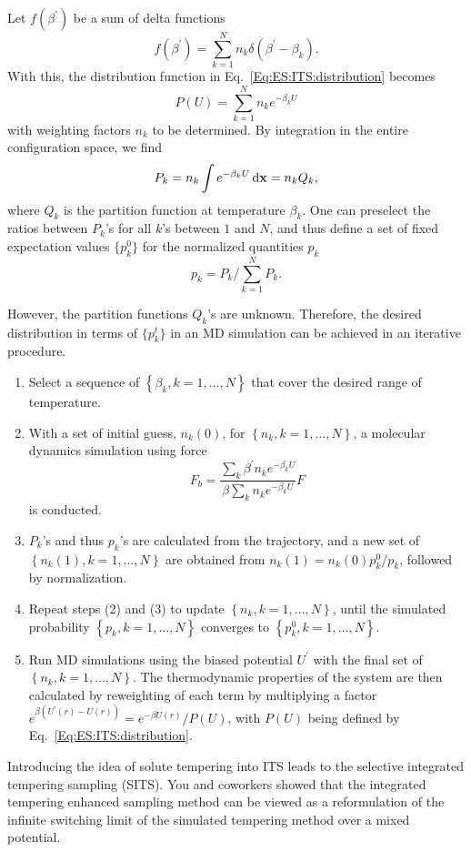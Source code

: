 Let $f(\beta^\prime)$ be a sum of delta functions
\begin{equation}
	f\left(\beta^{\prime}\right)=\sum_{k=1}^N n_k \delta\left(\beta^{\prime}-\beta_k\right) .
\end{equation}
With this, the distribution function in Eq.~\ref{Eq:ES:ITS:distribution} becomes
\begin{equation}
	P(U)=\sum_{k=1}^N n_k  e^{-\beta_k U}
\end{equation}
with weighting factors $n_k$ to be determined. By integration in  the entire configuration space, we find
\begin{equation}
	P_k= n_k \int e^{-\beta_k  U}\mathop{}\!\mathrm{d} \mathbf{x}= n_k Q_k,
\end{equation}
where $Q_k$ is the partition function at temperature $\beta_k$. One can preselect the ratios between $P_k$'s for all $k$'s between $1$ and $N$, and thus define a set of fixed expectation values $\{p_k^0\}$ for the normalized quantities $p_k$
\begin{equation}
	p_k=P_k/\sum_{k=1}^N P_k.
\end{equation}

However, the partition functions $Q_k$'s are unknown. Therefore, the desired distribution in terms of $\{p_k^t\}$ in an MD simulation can be achieved in an iterative procedure.
\begin{enumerate}
	\item Select a sequence of $\left\{\beta_k, k=1, \dots, N\right\}$ that cover the desired range of temperature.
	\item With a set of initial guess, $n_k(0)$, for $\left\{n_k, k=1, \dots, N\right\}$, a molecular dynamics simulation using force
	$$
	F_b=\frac{\sum_k \beta^{\prime} n_k e^{-\beta_k U}}{\beta \sum_k n_k e^{-\beta_k U}} F
	$$
	is conducted.
	\item $P_k$'s and thus $p_k$'s are calculated from the trajectory, and a new set of $\left\{n_k(1), k=1, \dots, N\right\}$ are obtained from $n_k(1)=n_k(0) p_k^0 / p_k$, followed by normalization.
	\item Repeat steps (2) and (3) to update $\left\{n_k, k=1, \dots, N\right\}$, until the simulated probability $\left\{p_k, k=1, \dots, N\right\}$ converges to $\left\{p_k^0, k=1, \dots, N\right\}$.
	\item Run MD simulations using the biased potential $U^\prime$ with the final set of $\left\{n_k, k=1, \dots, N\right\}$. The thermodynamic properties of the system are then calculated by reweighting of each term by multiplying a factor $e^{\beta\left(U^{\prime}(r)-U(r)\right)}=e^{-\beta U(r)} / P(U)$, with $P(U)$ being defined by Eq.~\ref{Eq:ES:ITS:distribution}.
\end{enumerate}

Introducing the idea of solute tempering into ITS leads to the selective integrated tempering sampling (SITS).\cite{YangJCP2009} You and coworkers showed that the integrated tempering enhanced sampling method can be viewed as a reformulation of the infinite switching limit of the simulated tempering method over a mixed potential. \cite{YouJCP2018}